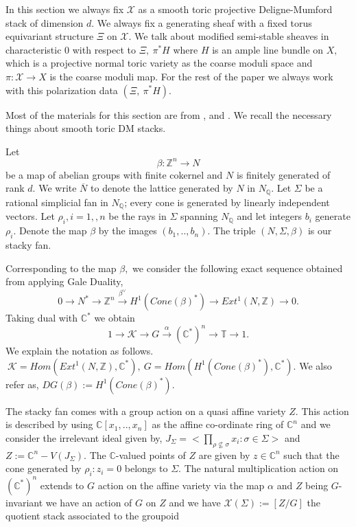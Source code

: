 \documentclass[10pt]{amsart}
\newcommand{\sX}{{\mathcal X}}
\numberwithin{equation}{subsection}
\begin{document}
In this section 
we always fix $\sX$ as a smooth toric projective Deligne-Mumford stack of dimension $d$. We always fix a generating sheaf with a fixed torus equivariant structure $\Xi$ on $\sX.$ We talk about modified semi-stable sheaves in characteristic $0$ with respect to  $\Xi,\ \pi^*H$ where $H$ is an ample line bundle on $X,$ which is a projective normal toric variety as the coarse moduli space and $\pi:\sX\to X$ is the coarse moduli map. For the rest of the paper we always work with this polarization data $
 (\Xi,\ \pi^*H).$ \par 
Most of the materials for this section are from \cite{BCS},\cite{FMN} and \cite{JT}. We recall the necessary things about smooth toric DM stacks.\par
Let $$\beta:\mathbb{Z}^n \to N$$ be a map of abelian groups with finite cokernel and $N$ is finitely generated of rank $d.$ We write $\overline{N}$ to denote the lattice generated by $N$ in $N_{\mathbb Q}.$ Let $\Sigma$ be a rational simplicial fan in $N_{\mathbb Q}$; every cone is generated by linearly independent vectors. Let $\rho_{i},i=1,,n$ be the rays in $\Sigma$ spanning $N_{\mathbb Q}$ and let integers $b_i$ generate $\rho_i.$ Denote the map $\beta$ by the images $(b_1,..,b_n).$ The triple $(N,\Sigma,\beta)$ is our stacky fan.\par
Corresponding to the map $\beta,$ we consider the following exact sequence obtained from applying Gale Duality,
$$0\to N^{*}\to \mathbb{Z}^n \xrightarrow{\beta^{\vee}} H^{1}(Cone(\beta)^{*})\to Ext^{1}(N,\mathbb{Z})\to 0.$$ Taking dual with $\mathbb{C}^{*}$ we obtain 
$$1\to \mathscr{K} \to G \xrightarrow{\alpha} (\mathbb{C^{*}})^{n}\to \mathbb{T} \to 1.$$ 
We explain the notation as follows.\\$\ \mathscr{K}=Hom(Ext^{1}(N,\mathbb{Z}),\mathbb{C}^{*}),\ G= Hom(H^{1}(Cone(\beta)^{*}),\mathbb{C}^{*}).$
We also refer as, $DG(\beta):=H^{1}(Cone(\beta)^*).$\par
The stacky fan comes with a group action on a quasi affine variety $Z.$ This action is described by using $\mathbb{C}[x_1,..,x_n]$ as the affine co-ordinate ring of $\mathbb{C}^n$ and we consider the irrelevant ideal given by, $J_{\Sigma}=<\prod_{\rho\nsubseteq \sigma} x_i :\sigma \in \Sigma >$ and $Z:=\mathbb{C}^n-V(J_{\Sigma}).$ The $\mathbb{C}$-valued points of $Z$ are given by $z\in \mathbb{C}^n$ such that the cone generated by $\rho_i:z_i=0$ belongs to $\Sigma.$ The natural multiplication action on $(\mathbb{C^*})^n$ extends to $G$ action on the affine variety via the map $\alpha$ and $Z$ being $G$-invariant we have an action of $G$ on $Z$ and we have $\sX(\Sigma):=[Z/G]$ the quotient stack associated to the groupoid
\end{document}
